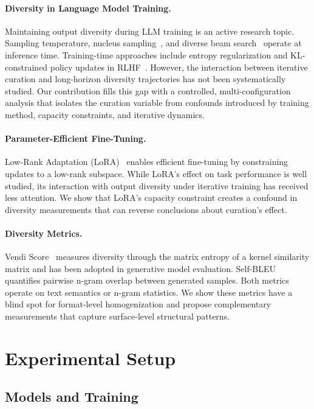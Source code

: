 \documentclass[11pt,a4paper]{article}
\begin{document}
\paragraph{Diversity in Language Model Training.}
Maintaining output diversity during LLM training is an active research topic. Sampling temperature, nucleus sampling~\cite{holtzman2020curious}, and diverse beam search~\cite{vijayakumar2018diverse} operate at inference time. Training-time approaches include entropy regularization and KL-constrained policy updates in RLHF~\cite{ouyang2022training}. However, the interaction between iterative curation and long-horizon diversity trajectories has not been systematically studied. Our contribution fills this gap with a controlled, multi-configuration analysis that isolates the curation variable from confounds introduced by training method, capacity constraints, and iterative dynamics.

\paragraph{Parameter-Efficient Fine-Tuning.}
Low-Rank Adaptation (LoRA)~\cite{hu2022lora} enables efficient fine-tuning by constraining updates to a low-rank subspace. While LoRA's effect on task performance is well studied, its interaction with output diversity under iterative training has received less attention. We show that LoRA's capacity constraint creates a confound in diversity measurements that can reverse conclusions about curation's effect.

\paragraph{Diversity Metrics.}
Vendi Score~\cite{friedman2023vendi} measures diversity through the matrix entropy of a kernel similarity matrix and has been adopted in generative model evaluation. Self-BLEU~\cite{zhu2018texygen} quantifies pairwise n-gram overlap between generated samples. Both metrics operate on text semantics or n-gram statistics. We show these metrics have a blind spot for format-level homogenization and propose complementary measurements that capture surface-level structural patterns.

\section{Experimental Setup}

\subsection{Models and Training}
\end{document}
